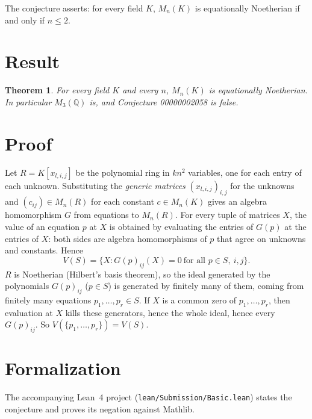 \documentclass[11pt]{article}
\theoremstyle{plain}
\newtheorem{theorem}{Theorem}
\theoremstyle{definition}
\theoremstyle{remark}
\begin{document}
The conjecture asserts: for every field $K$, $M_n(K)$ is equationally
Noetherian if and only if $n\le2$.

\section{Result}

\begin{theorem}\label{thm:main}
For every field $K$ and every $n$, $M_n(K)$ is equationally Noetherian. In
particular $M_3(\mathbb Q)$ is, and Conjecture 00000002058 is false.
\end{theorem}

\section{Proof}

Let $R=K[x_{l,i,j}]$ be the polynomial ring in $kn^2$ variables, one for each
entry of each unknown. Substituting the \emph{generic matrices}
$(x_{l,i,j})_{i,j}$ for the unknowns and $(c_{ij})\in M_n(R)$ for each constant
$c\in M_n(K)$ gives an algebra homomorphism $G$ from equations to $M_n(R)$. For
every tuple of matrices $X$, the value of an equation $p$ at $X$ is obtained by
evaluating the entries of $G(p)$ at the entries of $X$: both sides are algebra
homomorphisms of $p$ that agree on unknowns and constants. Hence
\[
  V(S)=\{X : G(p)_{ij}(X)=0\ \text{for all } p\in S,\ i,j\}.
\]
$R$ is Noetherian (Hilbert's basis theorem), so the ideal generated by the
polynomials $G(p)_{ij}$ ($p\in S$) is generated by finitely many of them, coming
from finitely many equations $p_1,\ldots,p_r\in S$. If $X$ is a common zero of
$p_1,\ldots,p_r$, then evaluation at $X$ kills these generators, hence the whole
ideal, hence every $G(p)_{ij}$. So $V(\{p_1,\ldots,p_r\})=V(S)$.

\section{Formalization}

The accompanying Lean~4 project (\texttt{lean/Submission/Basic.lean}) states
the conjecture and proves its negation against Mathlib.
\end{document}
